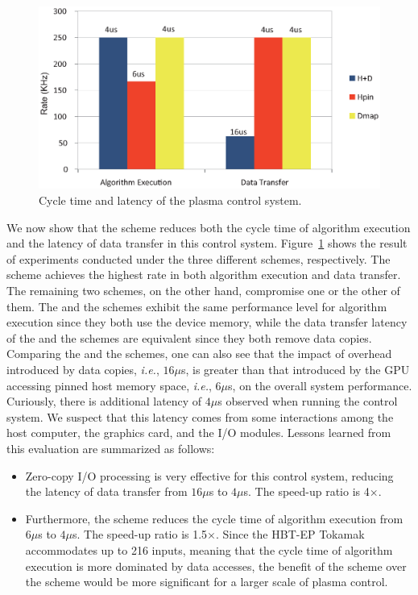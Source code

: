 \begin{figure}[t]
 \centering
 \includegraphics[width=\hsize]{eps/eval_plasma.eps}
 \caption{Cycle time and latency of the plasma control system.}
 \label{fig:eval_plasma}
\end{figure}

We now show that the {\dm} scheme reduces both the cycle time of
algorithm execution and the latency of data transfer in this control
system.
Figure~\ref{fig:eval_plasma} shows the result of experiments conducted
under the three different schemes, respectively.
The {\dm} scheme achieves the highest rate in both algorithm
execution and data transfer.
The remaining two schemes, on the other hand, compromise one or the
other of them.
The {\hd} and the {\dm} schemes exhibit the same performance level for
algorithm execution since they both use the device memory, while the
data transfer latency of the {\hp} and the {\dm} schemes are equivalent
since they both remove data copies.
Comparing the {\hd} and the {\hp} schemes, one can also see that the
impact of overhead introduced by data copies, \textit{i.e.}, $16\mu$s, is
greater than that introduced by the GPU accessing pinned host memory
space, \textit{i.e.}, $6\mu$s, on the overall system performance.
Curiously, there is additional latency of $4\mu$s observed when running
the control system.
We suspect that this latency comes from some interactions among the host
computer, the graphics card, and the I/O modules.
Lessons learned from this evaluation are summarized as follows:
\begin{itemize}
 \item Zero-copy I/O processing is very effective for this control
       system, reducing the latency of data transfer from $16\mu$s to
       $4\mu$s.
       The speed-up ratio is 4$\times$.
 \item Furthermore, the {\dm} scheme reduces the cycle time of algorithm
       execution from $6\mu$s to $4\mu$s.
       The speed-up ratio is 1.5$\times$.
       Since the HBT-EP Tokamak accommodates up to 216 inputs,
       meaning that the cycle time of algorithm execution is more
       dominated by data accesses, the benefit of the {\dm} scheme over
       the {\hp} scheme would be more significant for a larger scale of
       plasma control.
\end{itemize}

